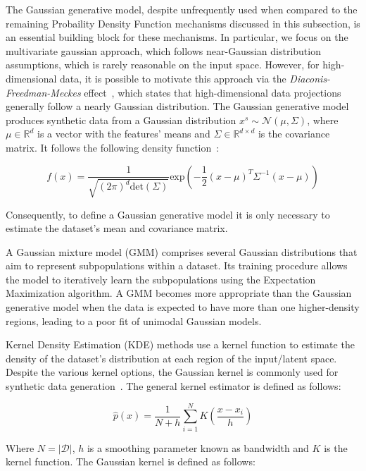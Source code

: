 The Gaussian generative model, despite unfrequently used when compared to the
remaining Probaility Density Function mechanisms discussed in this subsection,
is an essential building block for these mechanisms. In particular, we focus
on the multivariate gaussian approach, which follows near-Gaussian
distribution assumptions, which is rarely reasonable on the input space.
However, for high-dimensional data, it is possible to motivate this approach
via the \textit{Diaconis-Freedman-Meckes} effect~\cite{meckes2012projections},
which states that high-dimensional data projections generally follow a nearly
Gaussian distribution. The Gaussian generative model produces synthetic data
from a Gaussian distribution $x^s \sim \mathcal{N}(\mu, \Sigma)$, where $\mu
\in \mathbb{R}^d$ is a vector with the features' means and $\Sigma \in
\mathbb{R}^{d \times d}$ is the covariance matrix. It follows the following
density function~\cite{chanyaswad2019ron}:

\begin{equation}\label{eq:gaussian}
    f(x) =
    \frac{1}{\sqrt{(2\pi)^d\text{det}(\Sigma)}}\text{exp}\left(-\frac{1}{2}(x-\mu)^T\Sigma^{-1}(x-\mu)\right)
\end{equation}

Consequently, to define a Gaussian generative model it is only necessary to
estimate the dataset's mean and covariance matrix.

A Gaussian mixture model (GMM) comprises several Gaussian distributions that
aim to represent subpopulations within a dataset. Its training procedure
allows the model to iteratively learn the subpopulations using the Expectation
Maximization algorithm. A GMM becomes more appropriate than the Gaussian
generative model when the data is expected to have more than one
higher-density regions, leading to a poor fit of unimodal Gaussian models.

Kernel Density Estimation (KDE) methods use a kernel function to estimate the
density of the dataset's distribution at each region of the input/latent
space. Despite the various kernel options, the Gaussian kernel is commonly
used for synthetic data generation~\cite{tang2015kerneladasyn}. The general
kernel estimator is defined as follows: 

\begin{equation}
    \hat{p}(x) = \frac{1}{N+h}
    \sum_{i=1}^{N}K\left(\frac{x-x_i}{h}\right)
\end{equation}

Where $N = |\mathcal{D}|$, $h$ is a smoothing parameter known as bandwidth and
$K$ is the kernel function. The Gaussian kernel is defined as follows:

